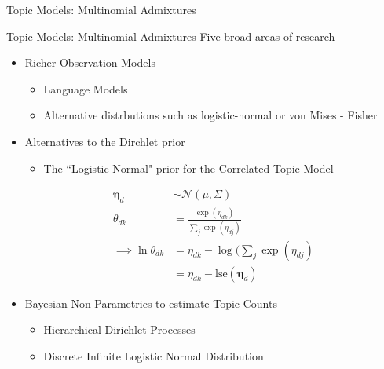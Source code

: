 \documentclass[xcolor=dvipsnames]{beamer}
\newcommand \vv[1] { \boldsymbol #1 }
\newcommand \nor[2]   { \mathcal{N} \left( {#1}, {#2} \right) }
\newcommand \lse { \text{lse} }
\begin{document}
\begin{frame}{Topic Models: Multinomial Admixtures}
\begin{itemize}
{\begin{itemize}
        \end{itemize}
    }
     { \smallskip }
\end{itemize}

\end{frame}




\begin{frame}{Topic Models: Multinomial Admixtures}
Five broad areas of research
\begin{itemize}
    \item<1-> Richer Observation Models
         { \begin{itemize}
        \item Language Models\cite{Wallach2006}\cite{Wang2007}\cite{Lindsey2012} 
        \item Alternative distrbutions such as logistic-normal\cite{Blei2006a}\cite{Eisenstein2010} or von Mises - Fisher\cite{Reisinger2010}
    \end{itemize} }
    
    \item<2-> Alternatives to the Dirchlet prior
     { 
        \begin{itemize}
            \item The ``Logistic Normal" prior for the Correlated Topic Model\cite{Blei2006}
        \end{itemize}

        \begin{align}
        \vv{\eta}_d & \sim \nor{\mu}{\Sigma} \\
        \theta_{dk} & = \frac{\exp(\eta_{dk})}{\sum_j \exp(\eta_{dj})} \\
        \implies \ln \theta_{dk} & = \eta_{dk} - \log(\sum_j \exp(\eta_{dj}) \\
         & = \eta_{dk} - \lse(\vv{\eta}_d)
    \end{align} 
    }

    \item<3-> Bayesian Non-Parametrics to estimate Topic Counts
     { \begin{itemize}
         \item Hierarchical Dirichlet Processes\cite{Teh2006b}
         \item Discrete Infinite Logistic Normal Distribution\cite{Paisley2012}
    \end{itemize} }


\end{itemize}
\end{frame}
\end{document}
